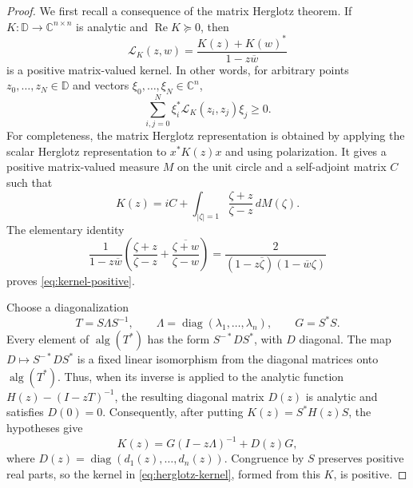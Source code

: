 \documentclass[11pt]{article}
\newcommand{\D}{\mathbb D}
\newcommand{\C}{\mathbb C}
\newcommand{\alg}{\operatorname{alg}}
\newcommand{\RePart}{\operatorname{Re}}
\begin{document}
\begin{proof}
We first recall a consequence of the matrix Herglotz theorem.  If
\(K:\D\to\C^{n\times n}\) is analytic and \(\RePart K\succeq0\), then
\begin{equation}
 \mathcal L_K(z,w)=\frac{K(z)+K(w)^*}{1-z\overline w}
 \label{eq:herglotz-kernel}
\end{equation}
is a positive matrix-valued kernel.  In other words, for arbitrary points
\(z_0,\ldots,z_N\in\D\) and vectors
\(\xi_0,\ldots,\xi_N\in\C^n\),
\begin{equation}
 \sum_{i,j=0}^N
 \xi_i^*\mathcal L_K(z_i,z_j)\xi_j\geq0.
 \label{eq:kernel-positive}
\end{equation}
For completeness, the matrix Herglotz representation is obtained by
applying the scalar Herglotz representation to \(x^*K(z)x\) and using
polarization.  It gives a positive matrix-valued measure \(M\) on the unit
circle and a self-adjoint matrix \(C\) such that
\[
 K(z)=iC+\int_{|\zeta|=1}\frac{\zeta+z}{\zeta-z}\,dM(\zeta).
\]
The elementary identity
\[
 \frac{1}{1-z\overline w}
 \left(
 \frac{\zeta+z}{\zeta-z}
 +
 \overline{\frac{\zeta+w}{\zeta-w}}
 \right)
 =
 \frac{2}{(1-z\overline\zeta)(1-\overline w\zeta)}
\]
proves \eqref{eq:kernel-positive}.

Choose a diagonalization
\[
 T=S\Lambda S^{-1},
 \qquad
 \Lambda=\operatorname{diag}(\lambda_1,\ldots,\lambda_n),
 \qquad
 G=S^*S.
\]
Every element of \(\alg(T^*)\) has the form \(S^{-*}DS^*\), with \(D\)
diagonal.  The map \(D\mapsto S^{-*}DS^*\) is a fixed linear isomorphism
from the diagonal matrices onto \(\alg(T^*)\).  Thus, when its inverse is
applied to the analytic function
\(H(z)-(I-zT)^{-1}\), the resulting diagonal matrix \(D(z)\) is analytic
and satisfies \(D(0)=0\).  Consequently, after putting
\(K(z)=S^*H(z)S\), the hypotheses give
\begin{equation}
 K(z)=G(I-z\Lambda)^{-1}+D(z)G,
 \label{eq:K-form}
\end{equation}
where \(D(z)=\operatorname{diag}(d_1(z),\ldots,d_n(z))\).  Congruence by
\(S\) preserves positive real parts, so the kernel in
\eqref{eq:herglotz-kernel}, formed from this \(K\), is positive.


\end{proof}
\end{document}

